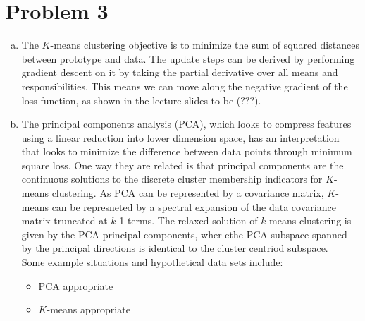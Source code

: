 \documentclass[11pt]{article}
\begin{document}
\section{Problem 3}
\begin{enumerate}[a.]
\item The $K$-means clustering objective is to minimize the sum of squared distances between prototype and data. The update steps can be derived by performing gradient descent on it by taking the partial derivative over all means and responsibilities. This means we can move along the negative gradient of the loss function, as shown in the lecture slides to be (???). 
\item The principal components analysis (PCA), which looks to compress features using a linear reduction into lower dimension space, has an interpretation that looks to minimize the difference between data points through minimum square loss. One way they are related is that principal components are the continuous solutions to the discrete cluster membership indicators for $K$-means clustering. As PCA can be represented by a covariance matrix, $K$-means can be represneted by a spectral expansion of the data covariance matrix truncated at $k$-1 terms. The relaxed solution of $k$-means clustering is given by the PCA principal components, wher ethe PCA subspace spanned by the principal directions is identical to the cluster centriod subspace.\\
Some example situations and hypothetical data sets include:
	\begin{itemize}
	\item PCA appropriate
	\item $K$-means appropriate
	\end{itemize}
\end{enumerate}
\end{document}
